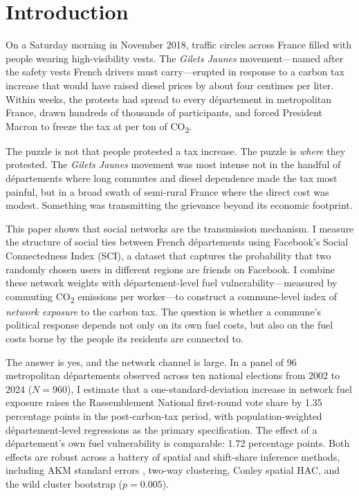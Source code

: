\documentclass[12pt]{article}
\providecommand{\euro}{\texteuro}
\newcommand{\rn}{Rassemblement National}
\newcommand{\gj}{\textit{Gilets Jaunes}}
\newcommand{\dept}{d\'{e}partement}
\newcommand{\depts}{d\'{e}partements}
\begin{document}

\section{Introduction}
\label{sec:intro}

On a Saturday morning in November 2018, traffic circles across France filled with people wearing high-visibility vests. The \gj{} movement---named after the safety vests French drivers must carry---erupted in response to a carbon tax increase that would have raised diesel prices by about four centimes per liter. Within weeks, the protests had spread to every \dept{} in metropolitan France, drawn hundreds of thousands of participants, and forced President Macron to freeze the tax at \euro 44.60 per ton of CO\textsubscript{2}.

The puzzle is not that people protested a tax increase. The puzzle is \emph{where} they protested. The \gj{} movement was most intense not in the handful of \depts{} where long commutes and diesel dependence made the tax most painful, but in a broad swath of semi-rural France where the direct cost was modest. Something was transmitting the grievance beyond its economic footprint.

This paper shows that social networks are the transmission mechanism. I measure the structure of social ties between French \depts{} using Facebook's Social Connectedness Index (SCI), a dataset that captures the probability that two randomly chosen users in different regions are friends on Facebook. I combine these network weights with \dept{}-level fuel vulnerability---measured by commuting CO\textsubscript{2} emissions per worker---to construct a commune-level index of \emph{network exposure} to the carbon tax. The question is whether a commune's political response depends not only on its own fuel costs, but also on the fuel costs borne by the people its residents are connected to.

The answer is yes, and the network channel is large. In a panel of 96 metropolitan \depts{} observed across ten national elections from 2002 to 2024 ($N = 960$), I estimate that a one-standard-deviation increase in network fuel exposure raises the \rn{} first-round vote share by 1.35 percentage points in the post-carbon-tax period, with population-weighted \dept{}-level regressions as the primary specification. The effect of a \dept{}'s own fuel vulnerability is comparable: 1.72 percentage points. Both effects are robust across a battery of spatial and shift-share inference methods, including AKM standard errors \citep{adao2019shift}, two-way clustering, Conley spatial HAC, and the wild cluster bootstrap ($p = 0.005$).
\end{document}
